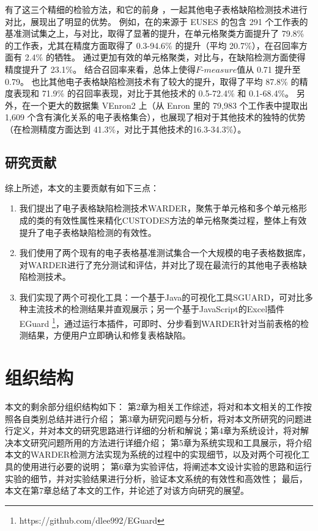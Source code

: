 有了这三个精细的检验方法，\wa 和它的前身 \cu，一起其他电子表格缺陷检测技术进行对比，展现出了明显的优势。
例如，在\cu 的来源于 EUSES \cite{fisher2005euses} 的包含 291 个工作表的基准测试集之上，\wa 与\cu 对比，取得了显著的提升，在单元格聚类方面提升了 79.8\% 的工作表，尤其在精度方面取得了 0.3-94.6\% 的提升（平均 20.7\%），在召回率方面有 2.4\% 的牺牲。
\wa 通过更加有效的单元格聚类，对比与\cu，在缺陷检测方面使得精度提升了 23.1\%。
结合召回率来看，总体上使得$F\text{-}measure$值从 0.71 提升至 0.79。
\wa 也比其他电子表格缺陷检测技术有了较大的提升，取得了平均 87.8\% 的精度表现和 71.9\% 的召回率表现，对比于其他技术的 0.5-72.4\% 和 0.1-68.4\%。
另外，在一个更大的数据集 VEnron2 \cite{xu2017spreadcluster} 上（从 Enron \cite{hermans2015enron} 里的 79,983 个工作表中提取出 1,609 个含有演化关系的电子表格集合），\wa 也展现了相对于其他技术的独特的优势（在检测精度方面达到 41.3\%，对比于其他技术的16.3-34.3\%）。

\subsection{研究贡献}

综上所述，本文的主要贡献有如下三点：

\begin{enumerate}
    \item 我们提出了电子表格缺陷检测技术WARDER，聚焦于单元格和多个单元格形成的类的有效性属性来精化CUSTODES方法的单元格聚类过程，整体上有效提升了电子表格缺陷检测的有效性。
    \item 我们使用了两个现有的电子表格基准测试集合一个大规模的电子表格数据库，对WARDER进行了充分测试和评估，并对比了现在最流行的其他电子表格缺陷检测技术。
    \item 我们实现了两个可视化工具：一个基于Java的可视化工具SGUARD\cite{li2019sguard}，可对比多种主流技术的检测结果并直观展示；另一个基于JavaScript的Excel插件 EGuard \footnote{https://github.com/dlee992/EGuard}，通过运行本插件，可即时、分步看到WARDER针对当前表格的检测结果，方便用户立即确认和修复表格缺陷。
\end{enumerate}

\section{组织结构}

本文的剩余部分组织结构如下：
第2章为相关工作综述，将对和本文相关的工作按照各自类别总结并进行介绍；
第3章为研究问题与分析，将对本文所研究的问题进行定义，并对本文的研究思路进行详细的分析和解说；第4章为系统设计，将对解决本文研究问题所用的方法进行详细介绍；
第5章为系统实现和工具展示，将介绍本文的WARDER检测方法实现为系统的过程中的实现细节，以及对两个可视化工具的使用进行必要的说明；
第6章为实验评估，将阐述本文设计实验的思路和运行实验的细节，并对实验结果进行分析，验证本文系统的有效性和高效性；
最后，本文在第7章总结了本文的工作，并论述了对该方向研究的展望。